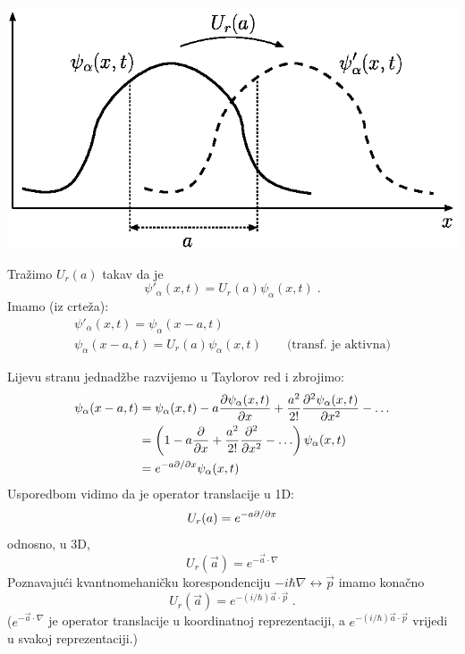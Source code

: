 \centerline{\includegraphics{pics/qmtranslacija.eps}}

Tražimo $U_{r}(a)$ takav da je
\begin{displaymath}
  \psi'_{\alpha}(x,t)= U_{r}(a)\psi_{\alpha}(x,t) \;.
\end{displaymath}
Imamo (iz crteža):
\begin{gather}
 \psi'_{\alpha}(x,t)=\psi_{\alpha}(x-a,t) \\
 \psi_{\alpha}(x-a,t)=U_{r}(a)\psi_{\alpha}(x,t) \qquad \text{(transf. je
  aktivna)} \label{optrans}
\end{gather}

Lijevu stranu jednadžbe razvijemo u Taylorov red i zbrojimo:
\begin{equation*}
\begin{split}
 \psi_{\alpha}(x-a,t)&=\psi_{\alpha}(x,t)-a\frac{\partial\psi_{\alpha}(x,t)}
{\partial x}+\frac{a^2}{2!}\frac{\partial^2 \psi_{\alpha}(x,t)}{\partial x^2}-\ldots \\
&=\left(1-a\frac{\partial}{\partial x}+\frac{a^2}{2!}\frac{\partial^2}{\partial x^2} - \ldots\right)
\psi_{\alpha}(x,t) \\
&=e^{-a \partial / \partial  x} \psi_{\alpha}(x,t)
\end{split}
\end{equation*}
Usporedbom vidimo da je operator translacije u 1D:
\begin{displaymath}
U_r(a)= e^{-a \partial / \partial  x}
\end{displaymath}
odnosno, u 3D,
\begin{displaymath}
U_r(\vec{a})= e^{-\vec{a}\cdot\nabla}
\end{displaymath}
Poznavajući kvantnomehaničku korespondenciju $-i\hbar\nabla \leftrightarrow
\vec{p}$ imamo konačno
\begin{equation}
U_r(\vec{a})= e^{-(i/\hbar)\vec{a}\cdot\vec{p}} \;.
\end{equation}
($e^{-\vec{a}\cdot\nabla}$ je operator translacije u koordinatnoj
reprezentaciji, a $e^{-(i/\hbar)\vec{a}\cdot\vec{p}}$ vrijedi u svakoj 
reprezentaciji.)

